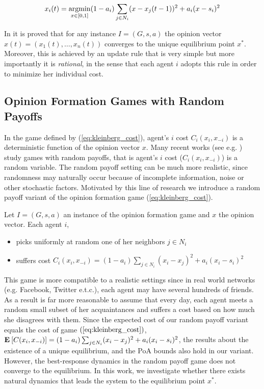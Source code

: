 \begin{equation}\label{eq:best_response}
  x_i(t) =
  \operatorname*{argmin}_{x \in [0,1]}
  (1-a_i) \sum_{j \in N_i} (x - x_j(t-1))^2 + a_i (x -s_i)^2
\end{equation}

In \cite{GS14} it is proved that for any instance $I=(G,s,a)$ the opinion
vector $x(t)=(x_1(t),\ldots,x_n(t))$ converges to the unique equilibrium point
$x^*$. Moreover, this is achieved by an update rule that is very simple
but more importantly it is \emph{rational}, in the sense
that each agent $i$ adopts this rule in order to minimize her individual cost.

\subsection{Opinion Formation Games with Random Payoffs}
In the game defined by (\ref{eq:kleinberg_cost}),
agent's $i$ cost $C_i(x_i,x_{-i})$ is a deterministic function of the
opinion vector $x$. Many recent works (see e.g. \cite{Zhou17}) study games
with random payoffs, that is agent's $i$ cost ($C_i(x_i,x_{-i})$) is a
random variable. The random payoff setting can be much more realistic,
since randomness may naturally occur because of incomplete information, noise
or other stochastic factors. Motivated by this
line of research we introduce a random payoff variant of the opinion
formation game (\ref{eq:kleinberg_cost}).

\begin{definition}\label{d:random_payoff_game}
  Let $I=(G,s,a)$ an instance of the opinion formation game
  and $x$ the opinion vector. Each agent $i$,
  \begin{itemize}
    \item picks uniformly at random one of her neighbors $j \in N_i$
    \item suffers cost
      $C_i(x_i,x_{-i}) = (1-a_i)\sum_{j \in N_i}(x_i-x_j)^2 + a_i(x_i-s_i)^2$
  \end{itemize}
\end{definition}

This game is more compatible to a realistic settings since
in real world networks (e.g. Facebook, Twitter e.t.c.), each agent may have
several hundreds of friends. As a result is far more reasonable to assume that
every day, each agent meets a random small subset of her acquaintances and
suffers a cost based on how much she disagrees with them.
Since the expected cost of our random payoff variant equals
the cost of game $(\ref{eq:kleinberg_cost})$, $ \Exp{C(x_i, x_{-i})} =
(1-a_i)\sum_{j \in N_i}(x_i-x_j)^2 + a_i(x_i-s_i)^2$,
the results about the existence of a unique equilibrium,
and the PoA bounds also hold in our variant.
However, the best-response dynamics in the random payoff game
does not converge to the equilibrium.  In this work, we investigate
whether there exists natural dynamics that leads the system to the
equilibrium point $x^*$.

